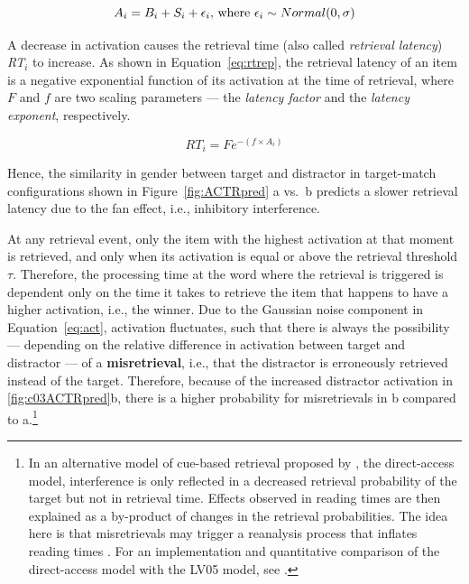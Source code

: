\documentclass{cambridge7A}\usepackage[]{graphicx}\usepackage[]{color}
\newcommand{\revFE}[1]{#1}
\begin{document}
\begin{equation}
  A_i = B_i + S_i + \epsilon_i  \hbox{, where } \epsilon_i \sim Normal(0,\sigma)  \label{eq:act}
\end{equation}

A decrease in activation causes the retrieval time \revFE{(also called  \emph{retrieval latency})} \textit{RT}$_i$ to increase. As shown in Equation~\ref{eq:rtrep}, the \revFE{retrieval latency} of an item is a negative exponential function of its activation at the time of retrieval, where $F$ and $f$ are two scaling parameters --- the \emph{latency factor} and the \emph{latency exponent}, respectively.

\begin{equation}
  \textit{RT}_i = Fe^{-(f\times A_i)} \label{eq:rtrep}
\end{equation}

Hence, the similarity in gender between target and distractor in target-match configurations shown in Figure~\ref{fig:ACTRpred} a vs.\ b predicts a slower retrieval latency due to the fan effect, \revFE{i.e., inhibitory interference}. 
\revFE{
At any retrieval event, only the item with the highest activation at that moment is retrieved, and only when its activation is equal or above the retrieval threshold $\tau$. Therefore, the processing time at the word where the retrieval is triggered is dependent only on the time it takes to retrieve the item that happens to have a higher activation, i.e., the winner.
Due to the Gaussian noise component in Equation~\ref{eq:act}, activation fluctuates, such that there is always the possibility --- depending on the relative difference in activation between target and distractor --- of a \textbf{misretrieval}, i.e., that the distractor is erroneously retrieved instead of the target. 
Therefore, because of the increased distractor activation in \ref{fig:c03ACTRpred}b, there is a higher probability for misretrievals in b compared to a.}\footnote{%
In an alternative model of cue-based retrieval proposed by \cite{McElree2006}, the direct-access model, interference is only reflected in a decreased retrieval probability of the target but not in retrieval time. 
  Effects observed in reading times are then explained as a by-product of changes in the retrieval probabilities. The idea here is that misretrievals may trigger a reanalysis process that inflates reading times \citep{McElree1993}. For an implementation and quantitative comparison of the direct-access model \citep{McElree2006} with the LV05 model, see \cite{NicenboimRetrieval2018}.}
\end{document}
